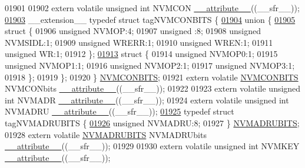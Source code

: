 \begin{DoxyCode}
01901 
01902 \textcolor{keyword}{extern} \textcolor{keyword}{volatile} \textcolor{keywordtype}{unsigned} \textcolor{keywordtype}{int}  NVMCON \hyperlink{a00009_a493c46f03454991ccc5aa7a6e1dfb2a7}{\_\_attribute\_\_}((\_\_sfr\_\_));
\hypertarget{a00009_source_l01903}{}\hyperlink{a00008}{01903} \_\_extension\_\_ \textcolor{keyword}{typedef} \textcolor{keyword}{struct }tagNVMCONBITS \{
\hypertarget{a00009_source_l01904}{}\hyperlink{a00009}{01904}   \textcolor{keyword}{union }\{
\hypertarget{a00009_source_l01905}{}\hyperlink{a00009}{01905}     \textcolor{keyword}{struct }\{
01906       \textcolor{keywordtype}{unsigned} NVMOP:4;
01907       \textcolor{keywordtype}{unsigned} :8;
01908       \textcolor{keywordtype}{unsigned} NVMSIDL:1;
01909       \textcolor{keywordtype}{unsigned} WRERR:1;
01910       \textcolor{keywordtype}{unsigned} WREN:1;
01911       \textcolor{keywordtype}{unsigned} WR:1;
01912     \};
\hypertarget{a00009_source_l01913}{}\hyperlink{a00009}{01913}     \textcolor{keyword}{struct }\{
01914       \textcolor{keywordtype}{unsigned} NVMOP0:1;
01915       \textcolor{keywordtype}{unsigned} NVMOP1:1;
01916       \textcolor{keywordtype}{unsigned} NVMOP2:1;
01917       \textcolor{keywordtype}{unsigned} NVMOP3:1;
01918     \};
01919   \};
01920 \} \hyperlink{a00008_d5/d0a/a00602}{NVMCONBITS};
01921 \textcolor{keyword}{extern} \textcolor{keyword}{volatile} \hyperlink{a00008_d5/d0a/a00602}{NVMCONBITS} NVMCONbits \hyperlink{a00009_a493c46f03454991ccc5aa7a6e1dfb2a7}{\_\_attribute\_\_}((\_\_sfr\_\_));
01922 
01923 \textcolor{keyword}{extern} \textcolor{keyword}{volatile} \textcolor{keywordtype}{unsigned} \textcolor{keywordtype}{int}  NVMADR \hyperlink{a00009_a493c46f03454991ccc5aa7a6e1dfb2a7}{\_\_attribute\_\_}((\_\_sfr\_\_));
01924 \textcolor{keyword}{extern} \textcolor{keyword}{volatile} \textcolor{keywordtype}{unsigned} \textcolor{keywordtype}{int}  NVMADRU \hyperlink{a00009_a493c46f03454991ccc5aa7a6e1dfb2a7}{\_\_attribute\_\_}((\_\_sfr\_\_));
\hypertarget{a00009_source_l01925}{}\hyperlink{a00008}{01925} \textcolor{keyword}{typedef} \textcolor{keyword}{struct }tagNVMADRUBITS \{
\hypertarget{a00009_source_l01926}{}\hyperlink{a00008_a4d837a6bcd628797de13fba4b2afbe77}{01926}   \textcolor{keywordtype}{unsigned} NVMADRU:8;
01927 \} \hyperlink{a00008_d6/db2/a00601}{NVMADRUBITS};
01928 \textcolor{keyword}{extern} \textcolor{keyword}{volatile} \hyperlink{a00008_d6/db2/a00601}{NVMADRUBITS} NVMADRUbits \hyperlink{a00009_a493c46f03454991ccc5aa7a6e1dfb2a7}{\_\_attribute\_\_}((\_\_sfr\_\_));
01929 
01930 \textcolor{keyword}{extern} \textcolor{keyword}{volatile} \textcolor{keywordtype}{unsigned} \textcolor{keywordtype}{int}  NVMKEY \hyperlink{a00009_a493c46f03454991ccc5aa7a6e1dfb2a7}{\_\_attribute\_\_}((\_\_sfr\_\_));

\end{DoxyCode}
